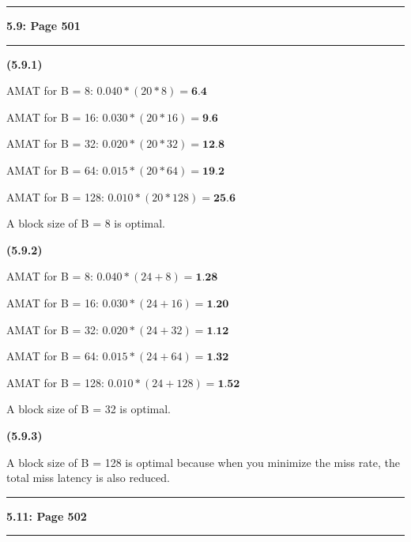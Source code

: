 \documentclass[11pt]{article}
\newcommand\question[2]{\vspace{.25in}\hrule\textbf{#1: #2}\vspace{.5em}\hrule\vspace{.10in}}
\renewcommand\part[1]{\vspace{.10in}\textbf{(#1)}\par}
\begin{document}
\question{5.9}{Page 501} %
	
	\part{5.9.1}
		AMAT for B = 8: $0.040 * (20 * 8) = \textbf{6.4}$\par
		AMAT for B = 16: $0.030 * (20 * 16) = \textbf{9.6}$\par
		AMAT for B = 32: $0.020 * (20 * 32) = \textbf{12.8}$\par
		AMAT for B = 64: $0.015 * (20 * 64) = \textbf{19.2}$\par
		AMAT for B = 128: $0.010 * (20 * 128) = \textbf{25.6}$\par
		A block size of B = 8 is optimal.\par
		
	\part{5.9.2}
		AMAT for B = 8: $0.040 * (24 + 8) = \textbf{1.28}$\par
		AMAT for B = 16: $0.030 * (24 + 16) = \textbf{1.20}$\par
		AMAT for B = 32: $0.020 * (24 + 32) = \textbf{1.12}$\par
		AMAT for B = 64: $0.015 * (24 + 64) = \textbf{1.32}$\par
		AMAT for B = 128: $0.010 * (24 + 128) = \textbf{1.52}$\par
		A block size of B = 32 is optimal.\par
		
	\part{5.9.3}
		A block size of B = 128 is optimal because when you minimize the miss rate, the total miss latency is also reduced.\par
		

\question{5.11}{Page 502} %
\end{document}
